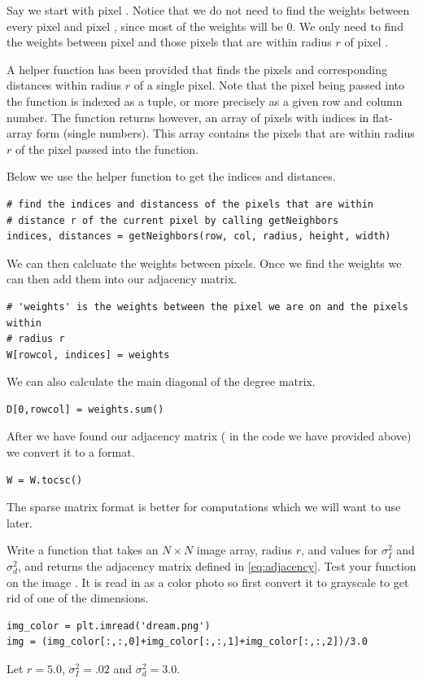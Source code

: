 Say we start with pixel . Notice that we do not need to find the weights between every pixel and pixel , since most of the weights will be 0. We only need to find the weights between pixel  and those pixels that are within radius $r$ of pixel . 

A helper function has been provided that finds the pixels and corresponding distances within radius $r$ of a single pixel. Note that the pixel being passed into the function is indexed as a tuple, or more precisely as a given row and column number. The function returns however, an array of pixels with indices in flat-array form (single numbers). This array contains the pixels that are within radius $r$ of the pixel passed into the function.

Below we use the helper function to get the indices and distances.

\begin{lstlisting}
# find the indices and distancess of the pixels that are within 
# distance r of the current pixel by calling getNeighbors
indices, distances = getNeighbors(row, col, radius, height, width)
\end{lstlisting}
We can then calcluate the weights between pixels. Once we find the weights we can then add them into our adjacency matrix. 
\begin{lstlisting}
# 'weights' is the weights between the pixel we are on and the pixels within
# radius r
W[rowcol, indices] = weights
\end{lstlisting}
We can also calculate the main diagonal of the degree matrix.
\begin{lstlisting}
D[0,rowcol] = weights.sum()
\end{lstlisting}

After we have found our adjacency matrix ( in the code we have provided above) we convert it to a  format. 
\begin{lstlisting}
W = W.tocsc()
\end{lstlisting}
The sparse matrix format  is better for computations which we will want to use later.




\begin{problem}
Write a function  that takes an $N \times N$ image array, radius $r$, and values for
$\sigma_I^2$ and $\sigma_d^2$, and returns the adjacency matrix defined in \eqref{eq:adjacency}. Test your function on the image . It is read in as a color photo so first convert it to grayscale to get rid of one of the dimensions.
\begin{lstlisting}
img_color = plt.imread('dream.png')
img = (img_color[:,:,0]+img_color[:,:,1]+img_color[:,:,2])/3.0
\end{lstlisting}
Let $r=5.0$, $\sigma_I^2=.02$ and $\sigma_d^2=3.0$.


\end{problem}

